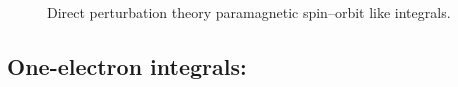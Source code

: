 \begin{description}
\item[] Direct perturbation theory paramagnetic
  spin--orbit like integrals. 


\end{description}


\subsection{One-electron integrals: }
\label{sec:oneinp}

